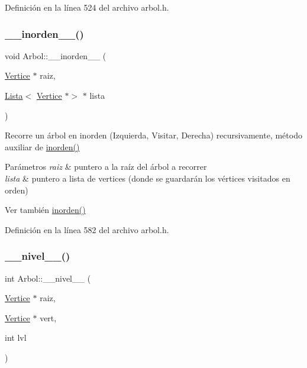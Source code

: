 Definición en la línea 524 del archivo arbol.\+h.

\mbox{\label{classArbol_ae3dc89f7db1fb9b54bcc2489eb1d9542}} 
\subsubsection{\texorpdfstring{\+\_\+\+\_\+inorden\+\_\+\+\_\+()}{\_\_inorden\_\_()}}
{\footnotesize\ttfamily void Arbol\+::\+\_\+\+\_\+inorden\+\_\+\+\_\+ (\begin{DoxyParamCaption}\item[{\hyperlink{classVertice}{Vertice} $\ast$}]{raiz,  }\item[{\hyperlink{classLista}{Lista}$<$ \hyperlink{classVertice}{Vertice} $\ast$$>$ $\ast$}]{lista }\end{DoxyParamCaption})\hspace{0.3cm}{\ttfamily [protected]}}



Recorre un árbol en inorden (Izquierda, Visitar, Derecha) recursivamente, método auxiliar de \hyperlink{classArbol_a80a0c3cf2d7f3e92a5c8e5504947dab5}{inorden()} 


\begin{DoxyParams}{Parámetros}
{\em raiz} & puntero a la raíz del árbol a recorrer \\
\hline
{\em lista} & puntero a lista de vertices (donde se guardarán los vértices visitados en orden) \\
\hline
\end{DoxyParams}
\begin{DoxySeeAlso}{Ver también}
\hyperlink{classArbol_a80a0c3cf2d7f3e92a5c8e5504947dab5}{inorden()} 
\end{DoxySeeAlso}


Definición en la línea 582 del archivo arbol.\+h.

\mbox{\label{classArbol_a479d9841f100bf75b87fb2155b66d591}} 
\subsubsection{\texorpdfstring{\+\_\+\+\_\+nivel\+\_\+\+\_\+()}{\_\_nivel\_\_()}}
{\footnotesize\ttfamily int Arbol\+::\+\_\+\+\_\+nivel\+\_\+\+\_\+ (\begin{DoxyParamCaption}\item[{\hyperlink{classVertice}{Vertice} $\ast$}]{raiz,  }\item[{\hyperlink{classVertice}{Vertice} $\ast$}]{vert,  }\item[{int}]{lvl }\end{DoxyParamCaption})\hspace{0.3cm}{\ttfamily [protected]}}




